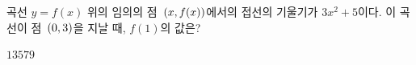 곡선 $y=f(x)$ 위의 임의의 점~$(x{,}\mkern3mu\mathopen{}f(x))$에서의 접선의 기울기가 $3x^2+5$이다. 이 곡선이 점~$(0{,}\mkern3mu\mathopen{}3)$을 지날 때, $f(1)$의 값은?
\begin{choices32}{$1$}{$3$}{$5$}{$7$}{$9$}\end{choices32}
